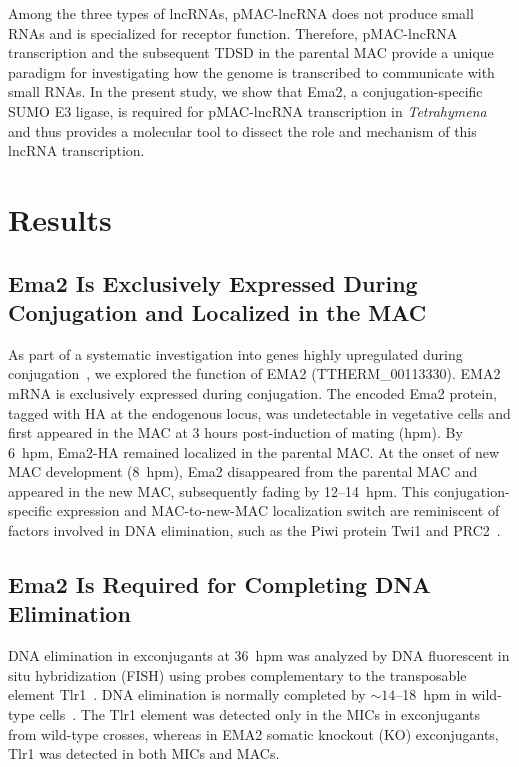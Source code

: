 \documentclass[12pt]{article}
\begin{document}
Among the three types of lncRNAs, pMAC-lncRNA does not produce small RNAs and is specialized for receptor function.
Therefore, pMAC-lncRNA transcription and the subsequent TDSD in the parental MAC provide a unique paradigm for investigating how the genome is transcribed to communicate with small RNAs.
In the present study, we show that Ema2, a conjugation-specific SUMO E3 ligase, is required for pMAC-lncRNA transcription in \textit{Tetrahymena} and thus provides a molecular tool to dissect the role and mechanism of this lncRNA transcription.

\section{Results}

\subsection{Ema2 Is Exclusively Expressed During Conjugation and Localized in the MAC}

As part of a systematic investigation into genes highly upregulated during conjugation~\citep{Loidl2021}, we explored the function of EMA2 (TTHERM\_00113330).
EMA2 mRNA is exclusively expressed during conjugation.
The encoded Ema2 protein, tagged with HA at the endogenous locus, was undetectable in vegetative cells and first appeared in the MAC at 3 hours post-induction of mating (hpm).
By 6~hpm, Ema2-HA remained localized in the parental MAC.
At the onset of new MAC development (8~hpm), Ema2 disappeared from the parental MAC and appeared in the new MAC, subsequently fading by 12--14~hpm.
This conjugation-specific expression and MAC-to-new-MAC localization switch are reminiscent of factors involved in DNA elimination, such as the Piwi protein Twi1 and PRC2~\citep{Mochizuki2002, Liu2007, Noto2010}.

\subsection{Ema2 Is Required for Completing DNA Elimination}

DNA elimination in exconjugants at 36~hpm was analyzed by DNA fluorescent in situ hybridization (FISH) using probes complementary to the transposable element Tlr1~\citep{Wuitschick2002}.
DNA elimination is normally completed by ${\sim}14$--18~hpm in wild-type cells~\citep{Austerberry1984, Mutazono2019}.
The Tlr1 element was detected only in the MICs in exconjugants from wild-type crosses, whereas in EMA2 somatic knockout (KO) exconjugants, Tlr1 was detected in both MICs and MACs.
\end{document}

